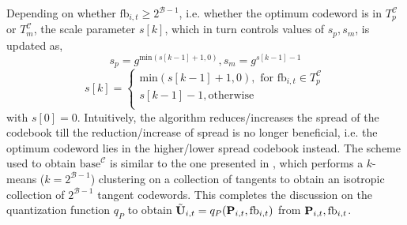 \documentclass[conference]{IEEEtran}
\begin{document}
Depending on whether $\text{fb}_{i,t} \geq 2^{\mathcal{B}-1}$, i.e. whether the optimum codeword is in $T^{\mathcal{C}}_p$ or $T^{\mathcal{C}}_m$, the scale parameter $s[k]$, which in turn controls values of $s_p, s_m$, is updated as,
$$s_p=g^{\text{min}(s[k-1]+1,0)}, s_m = g^{s[k-1]-1}$$
$$
s[k]=
\begin{cases}
\text{min}(s[k-1]+1,0), \text{ for } \text{fb}_{i,t} \in T^{\mathcal{C}}_p\\
s[k-1]-1, \text{otherwise}\\
\end{cases}
$$
with $s[0]=0$.
Intuitively, the algorithm reduces/increases the spread of the codebook till the reduction/increase of spread is no longer beneficial, i.e. the optimum codeword lies in the higher/lower spread codebook instead.
The scheme used to obtain $\text{base}^{\mathcal{C}}$ is similar to the one presented in \cite{Gupt1905:Predictive}, which performs a $k$-means ($k=2^{\mathcal{B}-1}$) clustering on a collection of tangents to obtain an isotropic collection of $2^{\mathcal{B}-1}$ tangent codewords.
This completes the discussion on the quantization function $q_P$ to obtain $\tilde{{\bf U}}_{i,t}=q_P({\bf P}_{i,t},\text{fb}_{i,t})$ from ${\bf P}_{i,t},\text{fb}_{i,t}$.
\end{document}
